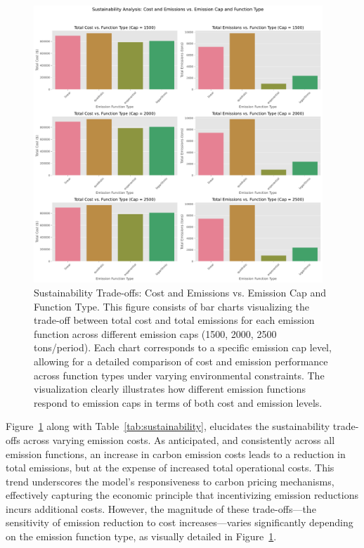 \begin{table}[htbp]
\begin{figure}[t!]
    \centering
    \includegraphics[width=0.97\textwidth]{images/sustainability_analysis.pdf}
    \caption{Sustainability Trade-offs: Cost and Emissions vs. Emission Cap and Function Type.
    This figure consists of bar charts visualizing the trade-off between total cost and total emissions for each emission function across different emission caps (1500, 2000, 2500 tons/period).  Each chart corresponds to a specific emission cap level, allowing for a detailed comparison of cost and emission performance across function types under varying environmental constraints. The visualization clearly illustrates how different emission functions respond to emission caps in terms of both cost and emission levels.}
    \label{fig:sustainability_analysis_bar}
\end{figure}


Figure~\ref{fig:sustainability_analysis_bar} along with Table~\ref{tab:sustainability}, elucidates the sustainability trade-offs across varying emission costs. As anticipated, and consistently across all emission functions, an increase in carbon emission costs leads to a reduction in total emissions, but at the expense of increased total operational costs. This trend underscores the model's responsiveness to carbon pricing mechanisms, effectively capturing the economic principle that incentivizing emission reductions incurs additional costs. However, the magnitude of these trade-offs—the sensitivity of emission reduction to cost increases—varies significantly depending on the emission function type, as visually detailed in Figure~\ref{fig:sustainability_analysis_bar}.


\end{table}
